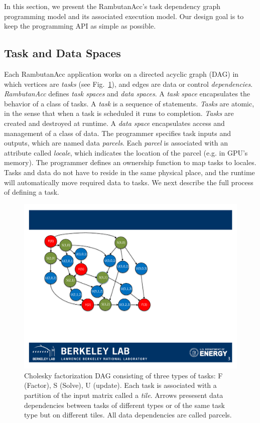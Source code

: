 In this section, we present the RambutanAcc's task dependency graph programming model and its associated execution model.
Our design goal is to keep the programming API as simple as possible.


\subsection{Task and Data Spaces}
Each RambutanAcc application works on a directed acyclic graph (DAG) in which vertices are {\em tasks} (see Fig.~\ref{fig:cholesky}),
and edges are data or control {\em dependencies}.
{\em RambutanAcc} defines {\em task spaces} and {\em data spaces}.
A {\em task space} encapsulates the behavior of a class of tasks.
A {\em task} is a sequence of statements.
{\em Tasks} are atomic, in the sense that when a task is scheduled it runs to completion.
{\em Tasks} are created and destroyed at runtime.
A {\em data space} encapsulates access and management of a class of data.
The programmer specifies task inputs and outputs, which are named data {\em parcels}.
Each {\em parcel} is associated with an attribute called {\em locale}, which indicates the location of the parcel (e.g. in GPU's memory).
The programmer defines an ownership function to map tasks to locales.
Tasks and data do not have to reside in the same physical place, and the runtime will automatically move required data to tasks.
We next describe the full process of defining a task.

\begin{figure}[htb]
\centering
\includegraphics[width=.4\textwidth]{figures/cholesky.pdf}
\caption{Cholesky factorization DAG consisting of three types of tasks: F (Factor), S (Solve), U (update). Each task is associated with a partition of the input matrix called a {\em tile}. Arrows presesent data dependencies between tasks of different types or of the same task type but on different tiles. All data dependencies are called parcels.}
\label{fig:cholesky}
\end{figure}



